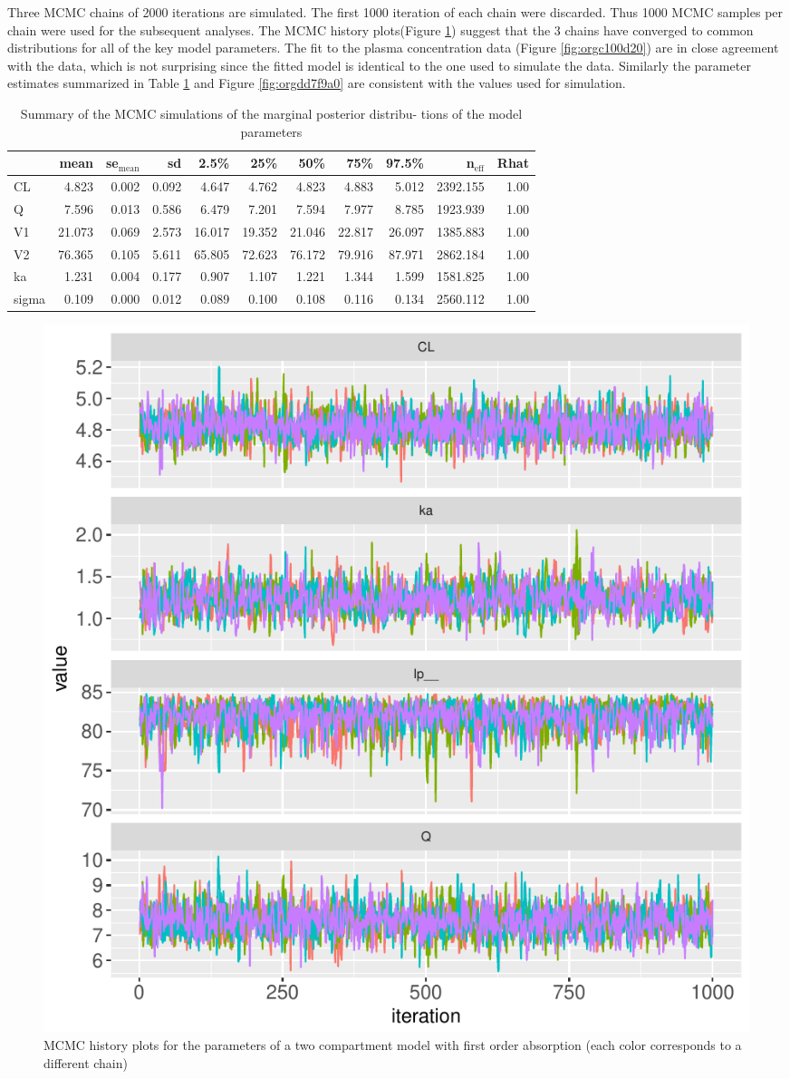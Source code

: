 \documentclass[11pt, reqno, oneside]{amsbook}
\numberwithin{equation}{chapter}
\numberwithin{figure}{chapter}
\numberwithin{table}{chapter}
\theoremstyle{remark}
\begin{document}
Three MCMC chains of 2000 iterations are simulated. The first
1000 iteration of each chain were discarded. Thus 1000 MCMC samples
per chain were used for the subsequent analyses.
The MCMC history plots(Figure \ref{fig:orgdd37564})
suggest that the 3 chains have converged to common distributions for
all of the key model parameters. The fit to the plasma concentration
data (Figure \ref{fig:orgc100d20}) are in close agreement with the
data, which is not surprising since the fitted model is identical to
the one used to simulate the data. Similarly the parameter estimates
summarized in Table \ref{tab:orgfc29338} and Figure \ref{fig:orgdd7f9a0}
are consistent with the values used for simulation.

\begin{table}[htbp]
\centering
\begin{tabular}{lrrrrrrrrrr}
\hline
 & mean & se\(_{\text{mean}}\) & sd & 2.5\% & 25\% & 50\% & 75\% & 97.5\% & n\(_{\text{eff}}\) & Rhat\\
\hline
CL & 4.823 & 0.002 & 0.092 & 4.647 & 4.762 & 4.823 & 4.883 & 5.012 & 2392.155 & 1.00\\
Q & 7.596 & 0.013 & 0.586 & 6.479 & 7.201 & 7.594 & 7.977 & 8.785 & 1923.939 & 1.00\\
V1 & 21.073 & 0.069 & 2.573 & 16.017 & 19.352 & 21.046 & 22.817 & 26.097 & 1385.883 & 1.00\\
V2 & 76.365 & 0.105 & 5.611 & 65.805 & 72.623 & 76.172 & 79.916 & 87.971 & 2862.184 & 1.00\\
ka & 1.231 & 0.004 & 0.177 & 0.907 & 1.107 & 1.221 & 1.344 & 1.599 & 1581.825 & 1.00\\
sigma & 0.109 & 0.000 & 0.012 & 0.089 & 0.100 & 0.108 & 0.116 & 0.134 & 2560.112 & 1.00\\
\hline
\end{tabular}
\caption{\label{tab:orgfc29338}
Summary of the MCMC simulations of the marginal posterior distribu- tions of the model parameters}

\end{table}

\begin{figure}[htbp]
\centering
\includegraphics[width=0.6\linewidth]{../example-models/R/deliv/figure/TwoCptModel/TwoCptModelPlots001.pdf}
\caption{\label{fig:orgdd37564}
MCMC history plots for the parameters of a two compartment model with first order absorption (each color corresponds to a different chain)}
\end{figure}
\end{document}
